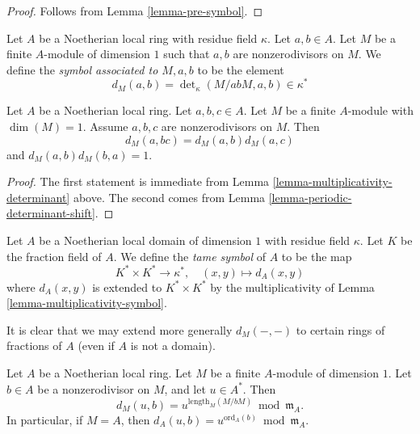\begin{proof}
Follows from Lemma \ref{lemma-pre-symbol}.
\end{proof}

\begin{definition}
\label{definition-symbol-M}
Let $A$ be a Noetherian local ring with residue field $\kappa$.
Let $a, b \in A$.
Let $M$ be a finite $A$-module of dimension $1$
such that $a, b$ are nonzerodivisors on $M$.
We define the {\it symbol associated to $M, a, b$}
to be the element
$$
d_M(a, b) =
\det\nolimits_\kappa(M/abM, a, b) \in \kappa^*
$$
\end{definition}

\begin{lemma}
\label{lemma-multiplicativity-symbol}
Let $A$ be a Noetherian local ring.
Let $a, b, c \in A$. Let $M$ be a finite $A$-module
with $\dim(M) = 1$. Assume $a, b, c$ are nonzerodivisors on $M$.
Then
$$
d_M(a, bc) = d_M(a, b) d_M(a, c)
$$
and $d_M(a, b)d_M(b, a) = 1$.
\end{lemma}

\begin{proof}
The first statement
is immediate from Lemma \ref{lemma-multiplicativity-determinant} above.
The second comes from Lemma \ref{lemma-periodic-determinant-shift}.
\end{proof}

\begin{definition}
\label{definition-tame-symbol}
Let $A$ be a Noetherian local domain of dimension $1$
with residue field $\kappa$.
Let $K$ be the fraction field of $A$.
We define the {\it tame symbol} of $A$ to be the map
$$
K^* \times K^* \longrightarrow \kappa^*,
\quad
(x, y) \longmapsto d_A(x, y)
$$
where $d_A(x, y)$ is extended to $K^* \times K^*$ by the multiplicativity of
Lemma \ref{lemma-multiplicativity-symbol}.
\end{definition}

\noindent
It is clear that we may extend more generally $d_M(-, -)$ to
certain rings of fractions of $A$ (even if $A$ is not a domain).

\begin{lemma}
\label{lemma-symbol-when-one-is-a-unit}
Let $A$ be a Noetherian local ring.
Let $M$ be a finite $A$-module of dimension $1$.
Let $b \in A$ be a nonzerodivisor on $M$, and let $u \in A^*$.
Then
$$
d_M(u, b) = u^{\text{length}_M(M/bM)} \bmod \mathfrak m_A.
$$
In particular, if $M = A$, then
$d_A(u, b) = u^{\text{ord}_A(b)} \bmod \mathfrak m_A$.
\end{lemma}

